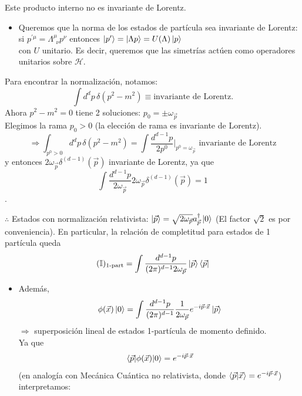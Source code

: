 \noindent Este producto interno no es invariante de Lorentz.
\begin{itemize}
    \item Queremos que la norma de los estados de partícula sea invariante de Lorentz: \\
          si $p^{\prime \mu} = \Lambda^\mu_{\ \ \nu} p^\nu$ entonces $\ket{p'} = \ket{\Lambda p} = U(\Lambda) \ket{p}$ \\
          con $U$ unitario. Es decir, queremos que las simetrías actúen como operadores unitarios sobre $\mathcal{H}$.
\end{itemize}
Para encontrar la normalización, notamos:
$$ \int d^d p \, \delta(p^2 - m^2) \equiv \text{invariante de Lorentz} . $$
Ahora $p^2 - m^2 = 0$ tiene 2 soluciones: $p_0 = \pm \omega_{\vec{p}}$ \\
Elegimos la rama $p_0 > 0$ (la elección de rama es invariante de Lorentz).
$$ \Rightarrow \int_{p^0 > 0} d^d p \, \delta(p^2 - m^2) = \int \frac{d^{d-1}p}{2p^0} \Bigg|_{p^0 = \omega_{\vec{p}}} \text{ invariante de Lorentz} $$
y entonces $2\omega_{\vec{p}} \delta^{(d-1)}(\vec{p})$ invariante de Lorentz, ya que $$\int \frac{d^{d-1}p}{2\omega_{\vec{p}}} 2\omega_{\vec{p}} \delta^{(d-1)}(\vec{p}) = 1$$.

\noindent $\therefore$ Estados con normalización relativista: $\ket{\vec{p}} = \sqrt{2\omega_{\vec{p}}} a_{\vec{p}}^\dagger \ket{0}$ (El factor $\sqrt{2}$ es por conveniencia).
En particular, la relación de completitud para estados de 1 partícula queda
$$ (\mathbb{I})_{\text{1-part}} = \int \frac{d^{d-1}p}{(2\pi)^{d-1} 2\omega_{\vec{p}}} \ket{\vec{p}}\bra{\vec{p}} $$

\begin{itemize}
    \item Además,
          $$ \phi(\vec{x})\ket{0} = \int \frac{d^{d-1}p}{(2\pi)^{d-1}} \frac{1}{2\omega_{\vec{p}}} e^{-i \vec{p} \cdot \vec{x}} \ket{\vec{p}} $$
          $\Rightarrow$ superposición lineal de estados 1-partícula de momento definido. \\
          Ya que
          $$ \matrixel{\vec{p}}{\phi(\vec{x})}{0} = e^{-i \vec{p} \cdot \vec{x}} $$
          (en analogía con Mecánica Cuántica no relativista, donde $\braket{\vec{p}}{\vec{x}} = e^{-i \vec{p} \cdot \vec{x}}$) \\
          interpretamos:
\end{itemize}
{\centering
{}
\par}

